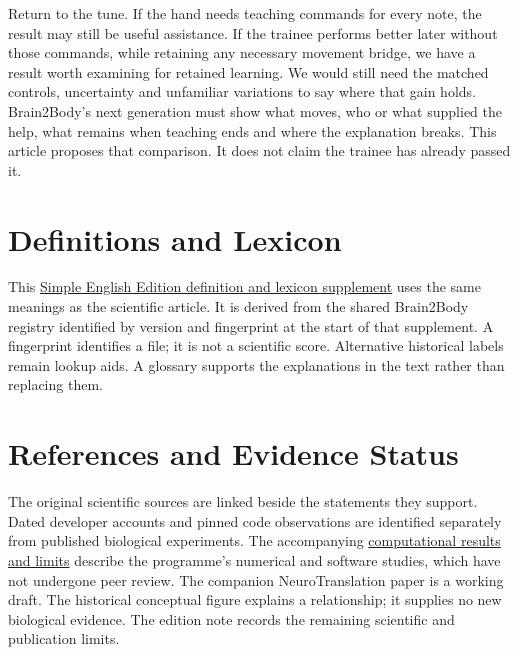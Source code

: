 Return to the tune. If the hand needs teaching commands for every note, the
result may still be useful assistance. If the trainee performs better later
without those commands, while retaining any necessary movement bridge, we
have a result worth examining for retained learning. We would still need the
matched controls, uncertainty and unfamiliar variations to say where that
gain holds. Brain2Body's next generation must show what moves, who or what
supplied the help, what remains when teaching ends and where the explanation
breaks. This article proposes that comparison. It does not claim the trainee
has already passed it.\par

\section{Definitions and Lexicon}

This \hyperref[programme-definitions]{Simple English Edition definition and lexicon supplement} uses the same meanings as the scientific article. It is derived from the shared Brain2Body registry identified by version and fingerprint at the start of that supplement. A fingerprint identifies a file; it is not a scientific score. Alternative historical labels remain lookup aids. A glossary supports the explanations in the text rather than replacing them.\par

\section{References and Evidence Status}

The original scientific sources are linked beside the statements they support.
Dated developer accounts and pinned code observations are identified separately
from published biological experiments. The accompanying
\href{research-evidence.json}{computational results and limits} describe the
programme's numerical and software studies, which have not undergone peer
review. The companion NeuroTranslation paper is a working draft. The historical
conceptual figure explains a relationship; it supplies no new biological
evidence. The edition note records the remaining scientific and publication
limits.\par

